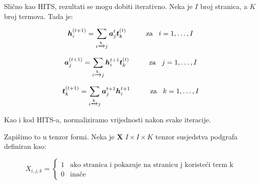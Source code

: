 \documentclass[11pt]{article}
\begin{document}
\begin{flushleft}
Slično kao HITS, rezultati se mogu dobiti iterativno. Neka je $I$ broj stranica, a $K$ broj termova. Tada je:
\end{flushleft}

\begin{equation}\label{eq:3}
    \boldsymbol{h}_{i}^{(t+1)} = \displaystyle\sum_{i \xrightarrow{\text{k}} j} \boldsymbol{a}_j^{t} \boldsymbol{t}_{k}^{(t)} \hspace{1cm} \text{za} \hspace{0.3cm} i = 1, \ldots, I
\end{equation}

\begin{equation}\label{eq:4}
    \boldsymbol{a}_{j}^{(t+1)} = \displaystyle\sum_{i \xrightarrow{\text{k}} j} \boldsymbol{h}_i^{t+1} \boldsymbol{t}_{k}^{(t)} \hspace{1cm} \text{za} \hspace{0.3cm} j = 1, \ldots, I
\end{equation}

\begin{equation}\label{eq:5}
    \boldsymbol{t}_{k}^{(t+1)} = \displaystyle\sum_{i \xrightarrow{\text{k}} j} \boldsymbol{a}_j^{t+1} \boldsymbol{h}_i^{t+1} \hspace{1cm} \text{za} \hspace{0.3cm} k = 1, \ldots, I
\end{equation}

\begin{raggedleft}
Kao i kod HITS-a, normaliziramo vrijednosti nakon svake iteracije.
\end{raggedleft}

\begin{flushleft}
Zapišimo to u tenzor formi. Neka je $\boldsymbol{X}$ $I \times I \times K $ tenzor susjedstva podgrafa definiran kao:
\end{flushleft}

\begin{equation}\label{eq:6}
    X_{i,j, k} =  \left\{
	\begin{array}{ll}
		1  & \mbox{ako stranica i pokazuje na stranicu j koristeći term k} \\
		0 & \mbox{inače }
	\end{array}
\right.
\end{equation}
\end{document}
